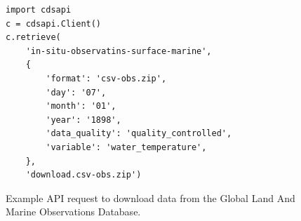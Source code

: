 \begin{figure}
\begin{verbatim}
import cdsapi
c = cdsapi.Client()
c.retrieve(
    'in-situ-observatins-surface-marine',
    {
        'format': 'csv-obs.zip',
        'day': '07',
        'month': '01',
        'year': '1898',
        'data_quality': 'quality_controlled',
        'variable': 'water_temperature',
    },
    'download.csv-obs.zip')
\end{verbatim}
\caption{Example API request to download data from the Global Land And Marine Observations Database.\\}
\label{fig:cds_api}
\end{figure}


\FloatBarrier
